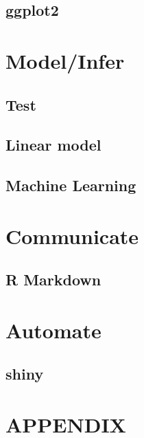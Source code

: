 \documentclass[
  12pt,
]{book}
\begin{document}
\hypertarget{ggplot2}{%
\chapter{ggplot2}\label{ggplot2}}

\hypertarget{part-modelinfer}{%
\part{Model/Infer}\label{part-modelinfer}}

\hypertarget{test}{%
\chapter{Test}\label{test}}

\hypertarget{linear-model}{%
\chapter{Linear model}\label{linear-model}}

\hypertarget{machine-learning}{%
\chapter{Machine Learning}\label{machine-learning}}

\hypertarget{part-communicate}{%
\part{Communicate}\label{part-communicate}}

\hypertarget{r-markdown}{%
\chapter{R Markdown}\label{r-markdown}}

\hypertarget{part-automate}{%
\part{Automate}\label{part-automate}}

\hypertarget{shiny}{%
\chapter{shiny}\label{shiny}}

\hypertarget{part-appendix}{%
\part{APPENDIX}\label{part-appendix}}
\end{document}
